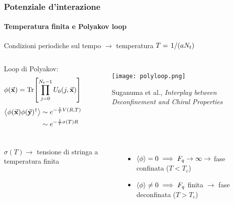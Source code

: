 \documentclass{beamer}
\begin{document}
\begin{frame}
	\frametitle{Potenziale d'interazione}
	\framesubtitle{Temperatura finita e Polyakov loop}

	Condizioni periodiche sul tempo $\rightarrow$ temperatura $T = \flatfrac{1}{(aN_t)}$

	\begin{columns}
			Loop di Polyakov:
			\begin{equation*}
					\phi(\va{x}) = \Tr[\prod_{j = 0}^{N_t - 1} U_0(j, \va{x})]
			\end{equation*}
			\begin{equation*}
				\begin{aligned}
					\expval{\phi(\va{x}) \phi(\va{y})^\dagger} &\sim e^{-\frac{1}{T} V(R, T)} \\
					&\sim e^{-\frac{1}{T}\sigma(T) R}						
				\end{aligned}
			\end{equation*}

			\begin{figure}[h]
				\centering
				\texttt{[image: polyloop.png]}
				\caption{Suganuma et al., \textit{Interplay between Deconfinement and Chiral Properties}}
			\end{figure}
	\end{columns}

	\begin{columns}
		\column{0.5\textwidth}
			$\sigma(T) \rightarrow$ tensione di stringa a temperatura finita

		\column{0.5\textwidth}
			\begin{itemize}
				\item $\expval{\phi} = 0 \implies F_q \rightarrow \infty \rightarrow$ \alert{fase confinata} ($T < T_c$)
				\item $\expval{\phi} \neq 0 \implies F_q$ finita $\rightarrow$ \alert{fase deconfinata} ($T > T_c$)
			\end{itemize}
	\end{columns}

\end{frame}
\end{document}
